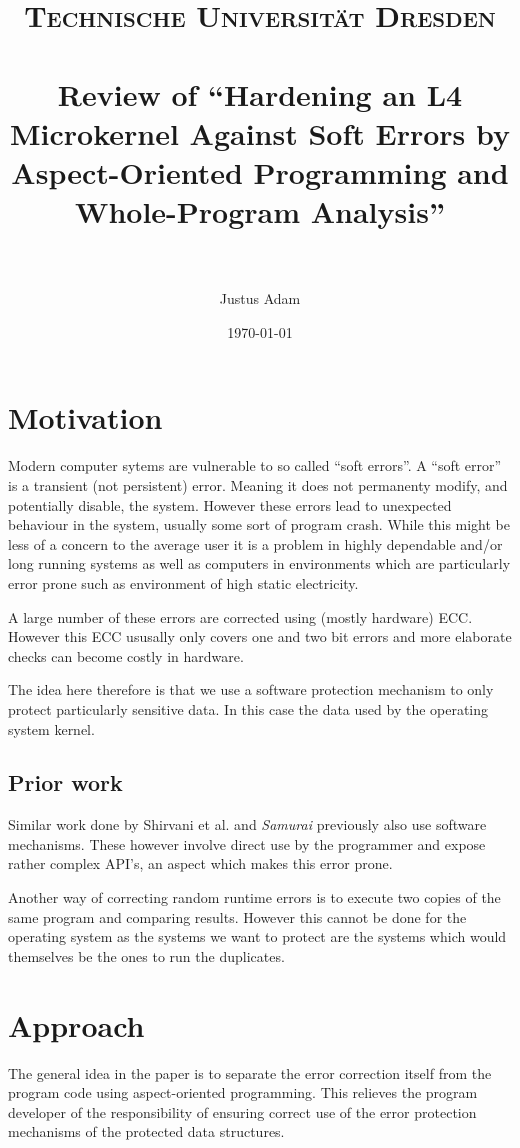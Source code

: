 \documentclass[paper=a4, fontsize=11pt]{scrartcl} %
\title{	
\normalfont \normalsize 
\textsc{Technische Universität Dresden} \\ [25pt] %
\horrule{0.5pt} \\[0.4cm] %
\huge Review of ``Hardening an L4 Microkernel Against Soft Errors by Aspect-Oriented Programming and Whole-Program Analysis'' \\ %
\horrule{2pt} \\[0.5cm] %
}
\author{Justus Adam} %
\date{\normalsize\today} %
\numberwithin{equation}{section} %
\numberwithin{figure}{section} %
\numberwithin{table}{section} %
\begin{document}
\maketitle %

\section{Motivation}

Modern computer sytems are vulnerable to so called ``soft errors''.
A ``soft error'' is a transient (not persistent) error.
Meaning it does not permanenty modify, and potentially disable, the system.
However these errors lead to unexpected behaviour in the system, usually some sort of program crash.
While this might be less of a concern to the average user it is a problem in highly dependable and/or long running systems as well as computers in environments which are particularly error prone such as environment of high static electricity.

A large number of these errors are corrected using (mostly hardware) ECC.
However this ECC ususally only covers one and two bit errors and more elaborate checks can become costly in hardware.

The idea here therefore is that we use a software protection mechanism to only protect particularly sensitive data.
In this case the data used by the operating system kernel.

\subsection{Prior work}

Similar work done by Shirvani et al.\cite{shirvani2000software} and \emph{Samurai}\cite{pattabiraman2008samurai} previously also use software mechanisms.
These however involve direct use by the programmer and expose rather complex API's, an aspect which makes this error prone.

Another way of correcting random runtime errors is to execute two copies of the same program and comparing results.
However this cannot be done for the operating system as the systems we want to protect are the systems which would themselves be the ones to run the duplicates.

\section{Approach}

The general idea in the paper\cite{borchert2016hardening} is to separate the error correction itself from the program code using aspect-oriented programming.
This relieves the program developer of the responsibility of ensuring correct use of the error protection mechanisms of the protected data structures.
\end{document}
